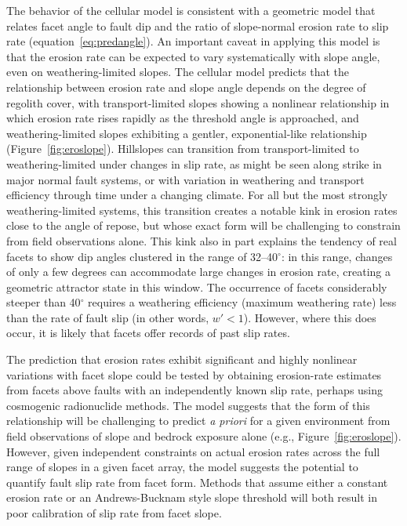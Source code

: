The behavior of the cellular model is consistent with a geometric model that relates facet angle to fault dip and the ratio of slope-normal erosion rate to slip rate (equation~\ref{eq:predangle}). An important caveat in applying this model is that the erosion rate can be expected to vary systematically with slope angle, even on weathering-limited slopes. The cellular model predicts that the relationship between erosion rate and slope angle depends on the degree of regolith cover, with transport-limited slopes showing a nonlinear relationship in which erosion rate rises rapidly as the threshold angle is approached, and weathering-limited slopes exhibiting a gentler, exponential-like relationship (Figure~\ref{fig:eroslope}). Hillslopes can transition from transport-limited to weathering-limited under changes in slip rate, as might be seen along strike in major normal fault systems, or with variation in weathering and transport efficiency through time under a changing climate. For all but the most strongly weathering-limited systems, this transition creates a notable kink in erosion rates close to the angle of repose, but whose exact form will be challenging to constrain from field observations alone. This kink also in part explains the tendency of real facets to show dip angles clustered in the range of 32--40$^\circ$: in this range, changes of only a few degrees can accommodate large changes in erosion rate, creating a geometric attractor state in this window. The occurrence of facets considerably steeper than 40$^\circ$ requires a weathering efficiency (maximum weathering rate) less than the rate of fault slip (in other words, $w'<1$). However, where this does occur, it is likely that facets offer records of past slip rates.

The prediction that erosion rates exhibit significant and highly nonlinear variations with facet slope could be tested by obtaining erosion-rate estimates from facets above faults with an independently known slip rate, perhaps using cosmogenic radionuclide methods. The model suggests that the form of this relationship will be challenging to predict \textit{a priori} for a given environment from field observations of slope and bedrock exposure alone (e.g., Figure~\ref{fig:eroslope}). However, given independent constraints on actual erosion rates across the full range of slopes in a given facet array, the model suggests the potential to quantify fault slip rate from facet form. Methods that assume either a constant erosion rate or an Andrews-Bucknam style slope threshold will both result in poor calibration of slip rate from facet slope. %

